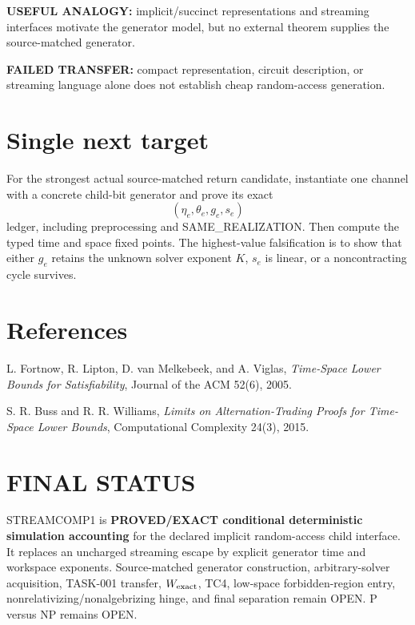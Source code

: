 \documentclass[11pt]{article}
\begin{document}
\textbf{USEFUL ANALOGY:} implicit/succinct representations and streaming interfaces motivate the generator model, but no external theorem supplies the source-matched generator.

\textbf{FAILED TRANSFER:} compact representation, circuit description, or streaming language alone does not establish cheap random-access generation.

\section*{Single next target}
For the strongest actual source-matched return candidate, instantiate one channel with a concrete child-bit generator and prove its exact
\[
(\eta_e,\theta_e,g_e,s_e)
\]
ledger, including preprocessing and SAME\_REALIZATION. Then compute the typed time and space fixed points. The highest-value falsification is to show that either \(g_e\) retains the unknown solver exponent \(K\), \(s_e\) is linear, or a noncontracting cycle survives.

\section*{References}
L. Fortnow, R. Lipton, D. van Melkebeek, and A. Viglas, \emph{Time-Space Lower Bounds for Satisfiability}, Journal of the ACM 52(6), 2005.

S. R. Buss and R. R. Williams, \emph{Limits on Alternation-Trading Proofs for Time-Space Lower Bounds}, Computational Complexity 24(3), 2015.

\section*{FINAL STATUS}
STREAMCOMP1 is \textbf{PROVED/EXACT conditional deterministic simulation accounting} for the declared implicit random-access child interface. It replaces an uncharged streaming escape by explicit generator time and workspace exponents. Source-matched generator construction, arbitrary-solver acquisition, TASK-001 transfer, \(W_{\rm exact}\), TC4, low-space forbidden-region entry, nonrelativizing/nonalgebrizing hinge, and final separation remain OPEN. P versus NP remains OPEN.

\end{document}
